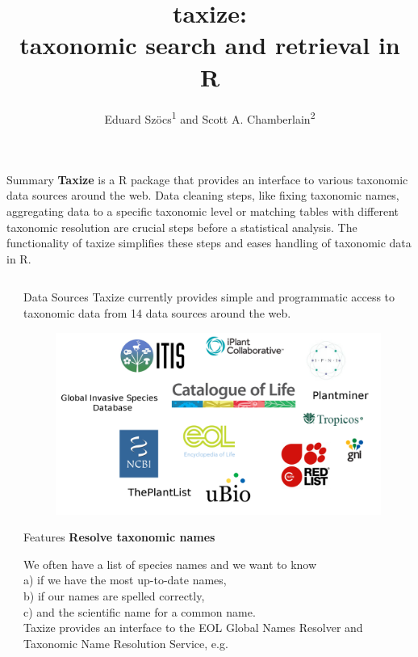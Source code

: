 \documentclass[final,t]{beamer}\usepackage[]{graphicx}\usepackage[]{color}
\title{taxize: \\[0.2em] taxonomic search and retrieval in R}
\author{Eduard Szöcs\textsuperscript{1} and Scott A. Chamberlain\textsuperscript{2}}
\institute{\textsuperscript{1}University of Koblenz-Landau, \textsuperscript{2}Simon Fraser University}
\begin{document}
  \begin{frame}[fragile]

		\begin{block}{\Large Summary}
    \Large \textcolor{i6bluedark}{\textbf{Taxize}} is a R package that provides an interface to various taxonomic data sources around the web.
    Data cleaning steps, like fixing taxonomic names, aggregating data to a specific taxonomic level or matching tables with different taxonomic resolution are crucial steps before a statistical analysis. 
    The functionality of taxize simplifies these steps and eases handling of taxonomic data in R. 
    
		\end{block}

	\begin{columns}[t]
		\begin{column}{0.01\linewidth}
		\end{column}

		\begin{column}{.49\linewidth}
			\vspace{-\baselineskip}  %
			\begin{block}{Data Sources}
        Taxize currently provides simple and programmatic access to taxonomic data from 14 data sources around the web.
        \vspace{0.5cm}
				\begin{figure}
					\includegraphics[width=0.8\linewidth]{fig/sources.png}
					\label{fig:sources}
				\end{figure}
			\end{block}

			\begin{block}{Features}
				\textcolor{i6bluedark}{\textbf{\large Resolve taxonomic names}}
        \vspace{0.5em}
        \par
        \begingroup
        \leftskip=2cm
        \noindent 
          We often have a list of species names and we want to know \\
          a) if we have the most up-to-date names, \\
          b) if our names are spelled correctly,  \\
          c) and the scientific name for a common name.\\
          Taxize provides an interface to the EOL Global Names Resolver and Taxonomic Name Resolution Service, e.g.
        \par
        \endgroup


\end{block}
\end{column}
\end{columns}
\end{frame}
\end{document}
